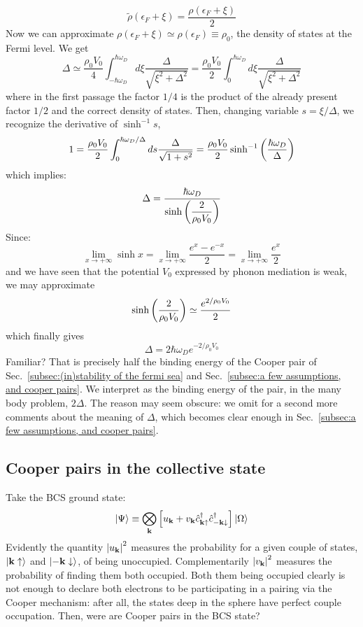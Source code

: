 \[
	\tilde{\rho}(\epsilon_F+\xi) = \frac{\rho(\epsilon_F+\xi)}{2}
\]
Now we can approximate $\rho(\epsilon_F+\xi) \simeq \rho(\epsilon_F) \equiv \rho_0$, the density of states at the Fermi level. We get
\[
	\Delta \simeq \frac{\rho_0 V_0}{4} \int_{-\hbar\omega_D}^{\hbar\omega_D} d\xi \frac{\Delta}{\sqrt{\xi^2 + \Delta^2}} = \frac{\rho_0 V_0}{2} \int_0^{\hbar\omega_D} d\xi \frac{\Delta}{\sqrt{\xi^2 + \Delta^2}}
\]
where in the first passage the factor $1/4$ is the product of the already present factor $1/2$ and the correct density of states. Then, changing variable $s=\xi/\Delta$, we recognize the derivative of $\sinh^{-1} s$,
\[
	1 = \frac{\rho_0 V_0}{2} \int_0^{\hbar\omega_D/\Delta} ds \frac{\Delta}{\sqrt{1 + s^2}} = \frac{\rho_0 V_0}{2} \sinh^{-1} \left({\frac{\hbar\omega_D}{\Delta}}\right)
\]
which implies:
\[
	\Delta = \frac{\hbar\omega_D}{\displaystyle
		\sinh\left({\frac{2}{\rho_0 V_0}}\right)
	}
\]
Since:
\[
	\lim_{x\to+\infty} \sinh x = \lim_{x\to+\infty} \frac{e^x - e^{-x}}{2} = \lim_{x\to+\infty} \frac{e^x}{2}
\]
and we have seen that the potential $V_0$ expressed by phonon mediation is weak, we may approximate
\[
	\sinh\left({\frac{2}{\rho_0 V_0}}\right) \simeq \frac{e^{2/\rho_0 V_0}}{2}
\]
which finally gives
\[
	\Delta = 2 \hbar\omega_D e^{-2/\rho_0 V_0}
\]
Familiar? That is precisely half the binding energy of the Cooper pair of Sec.~\ref{subsec:(in)stability of the fermi sea} and Sec.~\ref{subsec:a few assumptions, and cooper pairs}. We interpret as the binding energy of the pair, in the many body problem, $2\Delta$. The reason may seem obscure: we omit for a second more comments about the meaning of $\Delta$, which becomes clear enough in Sec.~\ref{subsec:a few assumptions, and cooper pairs}.

\subsection{Cooper pairs in the collective state}\label{subsec:cooper pairs in the collective state}

Take the BCS ground state:
\[
	\ket{\Psi} \equiv \bigotimes_\mathbf{k} \left[{u_\mathbf{k} + v_\mathbf{k} \hat{c}_{\mathbf{k}\uparrow}^\dagger \hat{c}_{-\mathbf{k}\downarrow}^\dagger}\right] \ket{\Omega}
\]
Evidently the quantity $\abs{u_\mathbf{k}}^2$ measures the probability for a given couple of states, $\ket{\mathbf{k}\uparrow}$ and $\ket{-\mathbf{k}\downarrow}$, of being unoccupied. Complementarily $\abs{v_\mathbf{k}}^2$ measures the probability of finding them both occupied. Both them being occupied clearly is not enough to declare both electrons to be participating in a pairing via the Cooper mechanism: after all, the states deep in the sphere have perfect couple occupation. Then, were are Cooper pairs in the BCS state?

